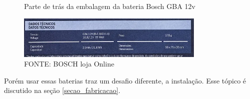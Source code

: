 \begin{figure}[ht]
	\centering
	\caption{Parte de trás da embalagem da bateria Bosch GBA 12v}
	\includegraphics[width=0.8\textwidth]{figures/gba_bosch_embalagem}
    \caption*{FONTE: BOSCH loja Online}
	\label{gba_bosch_embalagem}
\end{figure}

Porém usar essas baterias traz um desafio diferente, a instalação.  Esse tópico é discutido na seção \ref{secao_fabricacao}.


